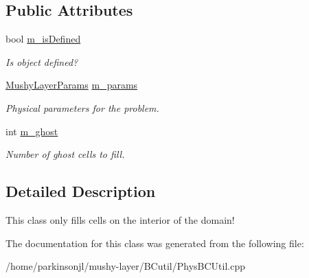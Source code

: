 \subsection*{Public Attributes}
\begin{DoxyCompactItemize}
\item 
\mbox{\label{class_basic_extrap_interior_function_a5911f83345d9b3cb0ee298bc3c064e51}} 
bool \hyperlink{class_basic_extrap_interior_function_a5911f83345d9b3cb0ee298bc3c064e51}{m\+\_\+is\+Defined}
\begin{DoxyCompactList}\small\item\em Is object defined? \end{DoxyCompactList}\item 
\mbox{\label{class_basic_extrap_interior_function_a2f965779be41bf4def8beb03fb734008}} 
\hyperlink{class_mushy_layer_params}{Mushy\+Layer\+Params} \hyperlink{class_basic_extrap_interior_function_a2f965779be41bf4def8beb03fb734008}{m\+\_\+params}
\begin{DoxyCompactList}\small\item\em Physical parameters for the problem. \end{DoxyCompactList}\item 
\mbox{\label{class_basic_extrap_interior_function_a3b76f37832a33939ce6b5a83b73648e0}} 
int \hyperlink{class_basic_extrap_interior_function_a3b76f37832a33939ce6b5a83b73648e0}{m\+\_\+ghost}
\begin{DoxyCompactList}\small\item\em Number of ghost cells to fill. \end{DoxyCompactList}\end{DoxyCompactItemize}


\subsection{Detailed Description}
This class only fills cells on the interior of the domain! 

The documentation for this class was generated from the following file\+:\begin{DoxyCompactItemize}
\item 
/home/parkinsonjl/mushy-\/layer/\+B\+Cutil/Phys\+B\+C\+Util.\+cpp\end{DoxyCompactItemize}
